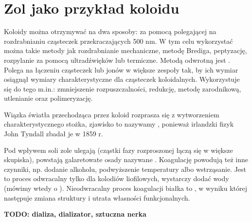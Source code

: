 \section{Zol jako przykład koloidu}
Koloidy można otrzymywać na dwa sposoby: za pomocą  polegającej na rozdrabnianiu cząsteczek przekraczających 500 nm.  W tym celu wykorzystać można takie metody jak rozdrabnianie mechaniczne, metodę Brediga, peptyzację, rozpylanie za pomocą ultradźwięków lub termiczne.
Metodą odwrotną jest . Polega na łączeniu cząsteczek lub jonów w większe zespoły tak, by ich wymiar osiągnął wymiary charakterystyczne dla cząsteczek koloidalnych. Wykorzystuje się do tego m.in.: zmniejszenie rozpuszczalności, redukcję, metodę zarodnikową, utlenianie oraz polimeryzację.

Wiązka światła przechodząca przez koloid rozprasza się z wytworzeniem charakterystycznego stożka, zjawisko to nazywamy , ponieważ irlandzki fizyk John Tyndall zbadał je w 1859 r.
%
%

Pod wpływem soli zole ulegają  (cząstki fazy rozproszonej łączą się w większe skupiska), powstają galaretowate osady nazywane .
Koagulację powodują też inne czynniki, np. dodanie alkoholu, podwyższenie temperatury albo wstrząsanie.
Jest to proces odwracalny tylko dla kolodiów liofilowych, wystarczy dodać wody (mówimy wtedy o ).
Nieodwracalny proces koagulacji białka to , w wyniku której następuje zmiana struktury i utrata własności funkcjonalnych.

\textbf{TODO: dializa, dializator, sztuczna nerka}
